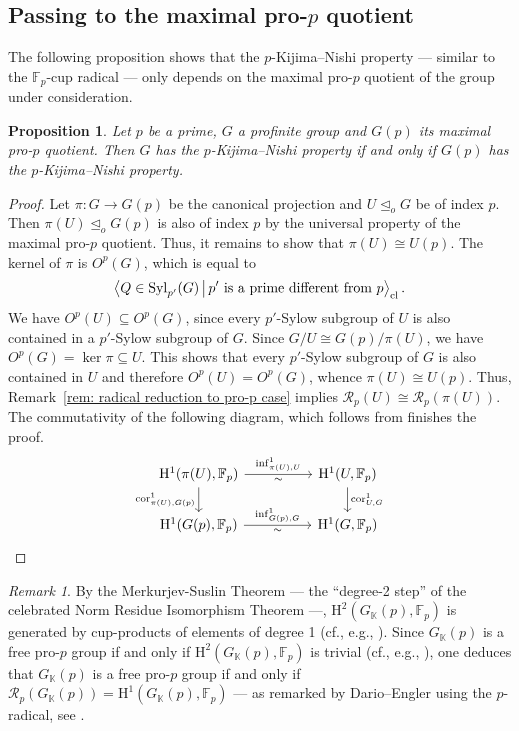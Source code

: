 \documentclass{amsart}
\newtheorem{prop}[thm]{Proposition}
\theoremstyle{definition}
\theoremstyle{remark}
\newtheorem{rem}[thm]{Remark}
\DeclareMathOperator{\cores}{cor}
\newcommand{\KK}{\mathbb{K}}
\newcommand{\FF}{\mathbb{F}}
\newcommand{\calR}{\mathcal{R}}
\newcommand{\rmH}{\mathrm H}%
\newcommand{\pres}[2]{\left\langle{#1}\, \big\vert\, {#2}\right\rangle}
\newcommand{\F}{\FF}
\begin{document}

\subsection{Passing to the maximal pro-\texorpdfstring{$p$}{} quotient}
The following proposition shows that the $p$-Kijima--Nishi property --- similar to the $\FF_p$-cup radical --- only depends on the maximal pro-$p$ quotient of the group under consideration.
\begin{prop}
\label{prop:passing to the pro-p quotient}
    Let $p$ be a prime, $G$ a profinite group and $G(p)$ its maximal pro-$p$ quotient. Then $G$ has the $p$-Kijima--Nishi property if and only if $G(p)$ has the $p$-Kijima--Nishi property.
\end{prop}
\begin{proof}
    Let $\pi:G\to G(p)$ be the canonical projection and $U\unlhd_oG$ be of index $p$. Then $\pi(U)\unlhd_o G(p)$ is also of index $p$ by the universal property of the maximal pro-$p$ quotient. Thus, it remains to show that $\pi(U)\cong U(p)$. The kernel of $\pi$ is ${O}^p(G)$, which is equal to
    \begin{align*}
        \pres{ Q\in \mathrm{Syl}_{p'}(G)}{p'\text{ is a prime different from } p}_{\rm cl}.
    \end{align*}
    We have ${O}^p(U)\subseteq O^p(G)$, since every $p'$-Sylow subgroup of $U$ is also contained in a $p'$-Sylow subgroup of $G$. Since $G/U\cong G(p)/\pi(U)$, we have $O^p(G)=\ker \pi\subseteq U$. This shows that every $p'$-Sylow subgroup of $G$ is also contained in $U$ and therefore $O^p(U)=O^p(G)$, whence $\pi(U)\cong U(p)$. Thus, Remark~\ref{rem: radical reduction to pro-p case} implies $\calR_p(U)\cong \calR_p(\pi(U))$. The commutativity of the following diagram, which follows from \cite[Prop. 1.5.5 (ii)]{NSW2008} finishes the proof.
    \begin{equation*}
        \begin{tikzcd}[column sep=huge]
            \rmH^1(\pi(U),\FF_p)\arrow[r,"\inf^1_{\pi(U),U}","\sim"']\arrow[d,swap,"\cores^1_{\pi(U),G(p)}"]&\rmH^1(U,\FF_p)\arrow[d,"\cores^1_{U,G}"]\\
            \rmH^1(G(p),\FF_p)\arrow[r,"\inf^1_{G(p),G}","\sim"']&\rmH^1(G,\FF_p)
        \end{tikzcd}
    \end{equation*}
\end{proof}

\begin{rem}
{ By the Merkurjev-Suslin Theorem --- the ``degree-2 step'' of the celebrated Norm Residue Isomorphism Theorem ---, $\rmH^2(G_{\KK}(p),\F_p)$ is generated by cup-products of elements of degree 1 (cf., e.g., \cite[Thm.~4.5.7--Thm.~4.6.6]{GilleSzamuely}). 
Since $G_{\KK}(p)$ is a free pro-$p$ group if and only if $\rmH^2(G_{\KK}(p),\F_p)$ is trivial (cf., e.g., \cite[Prop. 3.5.17]{NSW2008}), one deduces that $G_{\KK}(p)$ is a free pro-$p$ group if and only if $\calR_p(G_{\KK}(p))=\rmH^1(G_{\KK}(p),\F_p)$ --- as remarked by Dario--Engler using the $p$-radical, see \cite[\S 2]{DarioEngler}.}
\end{rem}
\end{document}
